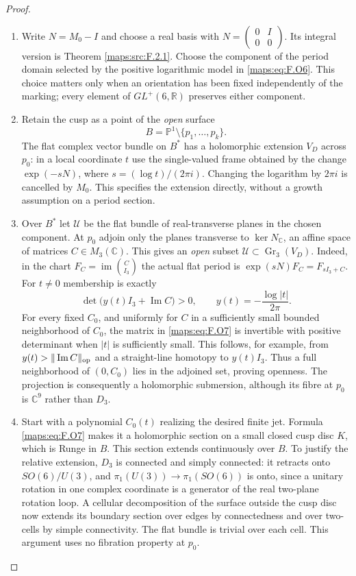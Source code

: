\begin{proof}
\begin{enumerate}[label=\arabic*.]
\item Write $N=M_0-I$ and choose a real basis with
$N=\left(\begin{smallmatrix}0&I\\0&0\end{smallmatrix}\right)$.
Its integral version is Theorem \ref{maps:src:F.2.1}.  Choose the component
of the period domain selected by the positive logarithmic
model in \eqref{maps:eq:F.O6}.  This choice matters only when an orientation
has been fixed independently of the marking; every element
of $GL^+(6,\mathbb R)$ preserves either component.

\item Retain the cusp as a point of the \emph{open} surface
\[
 B=\mathbb P^1\setminus\{p_1,\ldots,p_k\}.
\]
The flat complex vector bundle on $B^*$ has a holomorphic
extension $V_D$ across $p_0$: in a local coordinate $t$ use
the single-valued frame obtained by the change
$\exp(-sN)$, where $s=(\log t)/(2\pi i)$.
Changing the logarithm by $2\pi i$ is cancelled by $M_0$.
This specifies the extension directly, without a growth
assumption on a period section.

\item Over $B^*$ let $\mathscr U$ be the flat bundle of real-transverse
planes in the chosen component.  At $p_0$ adjoin only the
planes transverse to $\ker N_\mathbb C$, an affine space of
matrices $C\in M_3(\mathbb C)$.  This gives an \emph{open}
subset $\mathscr U\subset\operatorname{Gr}_3(V_D)$.
Indeed, in the chart $F_C=\operatorname{im}\binom C{I_3}$
the actual flat period is
$\exp(sN)F_C=F_{sI_3+C}$.  For $t\ne0$ membership is exactly
\[
 \det\bigl(y(t)I_3+\operatorname{Im}C\bigr)>0,
 \qquad y(t)=-\frac{\log|t|}{2\pi}.
 \tag{F.O7}\label{maps:eq:F.O7}
\]
For every fixed $C_0$, and uniformly for $C$ in a sufficiently
small bounded neighborhood of $C_0$, the matrix in \eqref{maps:eq:F.O7} is
invertible with positive determinant when $|t|$ is sufficiently
small.  This follows, for example, from
$y(t)>\|\operatorname{Im}C\|_{\rm op}$ and a straight-line
homotopy to $y(t)I_3$.  Thus a full neighborhood of
$(0,C_0)$ lies in the adjoined set, proving openness.
The projection is consequently a holomorphic submersion,
although its fibre at $p_0$ is $\mathbb C^9$ rather than $D_3$.

\item Start with a polynomial $C_0(t)$ realizing the desired finite
jet.  Formula \eqref{maps:eq:F.O7} makes it a holomorphic section on a small
closed cusp disc $K$, which is Runge in $B$.
This section extends continuously over $B$.  To justify the
relative extension, $D_3$ is connected and simply connected:
it retracts onto $SO(6)/U(3)$, and
$\pi_1(U(3))\to\pi_1(SO(6))$ is onto, since a unitary rotation
in one complex coordinate is a generator of the real
two-plane rotation loop.  A cellular decomposition of the
surface outside the cusp disc now extends its boundary
section over edges by connectedness and over two-cells by
simple connectivity.  The flat bundle is trivial over each
cell.  This argument uses no fibration property at $p_0$.


\end{enumerate}
\end{proof}
